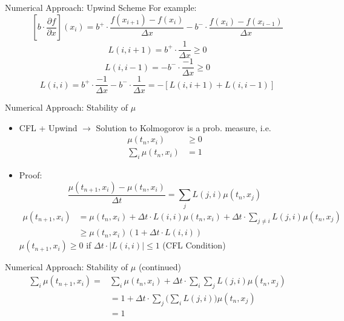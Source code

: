 \documentclass{beamer}
\begin{document}
	\begin{frame}{Numerical Approach: Upwind Scheme}
		For example:
		\begin{equation}
		\left[b \cdot \frac{\partial f}{\partial x} \right](x_i)=b^{+} \cdot \frac{f(x_{i+1})-f(x_i)}{\Delta x}-b^{-} \cdot \frac{f(x_{i})-f(x_{i-1})}{\Delta x}
		\end{equation}
		\begin{equation}
		L(i,i+1)=b^{+} \cdot \frac{1}{\Delta x} \geq 0
		\end{equation}
		\begin{equation}
		L(i,i-1)=-b^{-} \cdot \frac{-1}{\Delta x} \geq 0
		\end{equation}
		\begin{equation}
		L(i,i)=b^{+} \cdot \frac{-1}{\Delta x}-b^{-} \cdot \frac{1}{\Delta x} = -[L(i,i+1)+L(i,i-1)]
		\end{equation}
	\end{frame}
	
	\begin{frame}{Numerical Approach: Stability of $\mu$}
		\begin{itemize}
			\item CFL + Upwind $\rightarrow$ Solution to Kolmogorov is a prob. measure, i.e.
			\begin{equation}
			\begin{split}
			\mu(t_n,x_i) & \geq 0 \\
			\sum_i \mu(t_n,x_i) &= 1
			\end{split}
			\end{equation}
			\item Proof:
			\begin{equation}
			\frac{\mu(t_{n+1},x_i)-\mu(t_{n},x_i)}{\Delta t}=\sum_{j} L(j,i) \mu(t_n,x_j)
			\end{equation}
			\begin{equation}
			\begin{split}
			\mu(t_{n+1},x_i)&=\mu(t_{n},x_i)+ \Delta t \cdot L(i,i)\mu(t_n,x_i) + \Delta t \cdot \sum_{j\neq i} L(j,i) \mu(t_n,x_j)  \\
			& \geq \mu(t_{n},x_i) (1+ \Delta t \cdot L(i,i))
			\end{split}
			\end{equation}
			$\mu(t_{n+1},x_i) \geq 0$ if $\Delta t \cdot| L(i,i)| \leq 1$ (CFL Condition)
		\end{itemize}
	\end{frame}
	
	\begin{frame}{Numerical Approach: Stability of $\mu$ (continued)}
		\begin{equation}
		\begin{split}
		\sum_i \mu(t_{n+1},x_i)=& \sum_i \mu(t_{n},x_i)+\Delta t \cdot \sum_i \sum_{j} L(j,i) \mu(t_n,x_j) \\
		& = 1 + \Delta t \cdot \sum_j \Big(\sum_i L(j,i)\Big) \mu(t_n,x_j) \\
		& = 1
		\end{split}
		\end{equation}
	\end{frame}
\end{document}
